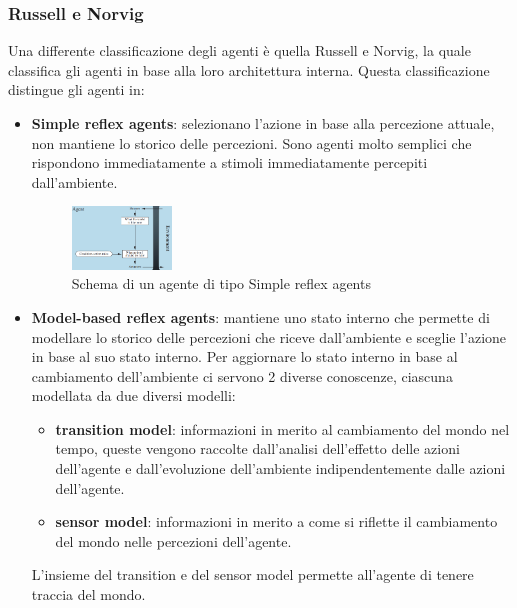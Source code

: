 \subsubsection{Russell e Norvig}
Una differente classificazione degli agenti è quella Russell e Norvig, la quale
classifica gli agenti in base alla loro architettura interna. Questa classificazione
distingue gli agenti in:
\begin{itemize}
    \item \textbf{Simple reflex agents}: selezionano l'azione in base alla
          percezione attuale, non mantiene lo storico delle percezioni. Sono
          agenti molto semplici che rispondono immediatamente a stimoli immediatamente
          percepiti dall'ambiente.
          \begin{figure}[!ht]
              \centering
              \includegraphics[width=0.25\textwidth]{./img/Agenti/SimpleReflexAgents.png}
              \caption{Schema di un agente di tipo Simple reflex agents}
              \label{fig:simpleReflex}
          \end{figure}
    \item \textbf{Model-based reflex agents}: mantiene uno stato interno che permette
          di modellare lo storico delle percezioni che riceve dall'ambiente e sceglie
          l'azione in base al suo stato interno. Per aggiornare lo stato interno
          in base al cambiamento dell'ambiente ci servono 2 diverse conoscenze, ciascuna
          modellata da due diversi modelli:
          \begin{itemize}
              \item \textbf{transition model}: informazioni in merito
                    al cambiamento del mondo nel tempo, queste vengono raccolte
                    dall'analisi dell'effetto delle azioni dell'agente e
                    dall'evoluzione dell'ambiente indipendentemente dalle azioni
                    dell'agente.
              \item \textbf{sensor model}: informazioni in merito a come si
                    riflette il cambiamento del mondo nelle percezioni dell'agente.
          \end{itemize}
          L'insieme del transition e del sensor model permette all'agente di tenere
          traccia del mondo.

\end{itemize}
